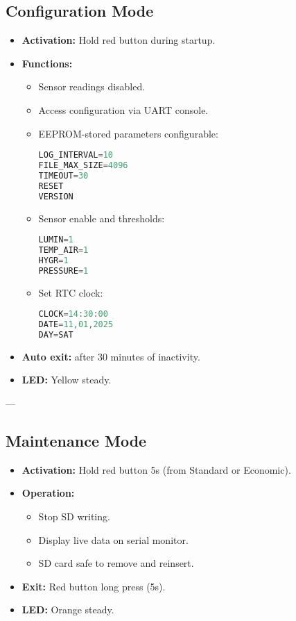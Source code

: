 \documentclass[a4paper,12pt]{article}
\begin{document}
\subsection{Configuration Mode}
\begin{itemize}
  \item \textbf{Activation:} Hold red button during startup.
  \item \textbf{Functions:}
  \begin{itemize}
    \item Sensor readings disabled.
    \item Access configuration via UART console.
    \item EEPROM-stored parameters configurable:
\begin{lstlisting}[language=C]
LOG_INTERVAL=10
FILE_MAX_SIZE=4096
TIMEOUT=30
RESET
VERSION
\end{lstlisting}
    \item Sensor enable and thresholds:
\begin{lstlisting}[language=C]
LUMIN=1
TEMP_AIR=1
HYGR=1
PRESSURE=1
\end{lstlisting}
    \item Set RTC clock:
\begin{lstlisting}[language=C]
CLOCK=14:30:00
DATE=11,01,2025
DAY=SAT
\end{lstlisting}
  \end{itemize}
  \item \textbf{Auto exit:} after 30 minutes of inactivity.
  \item \textbf{LED:} Yellow steady.
\end{itemize}

---

\subsection{Maintenance Mode}
\begin{itemize}
  \item \textbf{Activation:} Hold red button 5s (from Standard or Economic).
  \item \textbf{Operation:}
  \begin{itemize}
    \item Stop SD writing.
    \item Display live data on serial monitor.
    \item SD card safe to remove and reinsert.
  \end{itemize}
  \item \textbf{Exit:} Red button long press (5s).
  \item \textbf{LED:} Orange steady.
\end{itemize}
\end{document}
